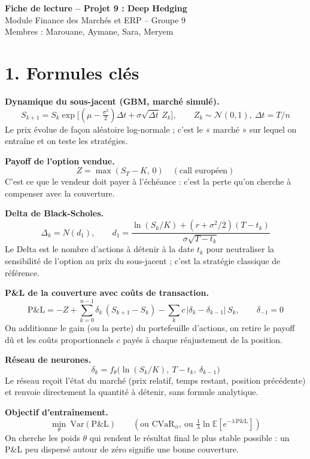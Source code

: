 \documentclass[10.5pt,a4paper]{article}
\begin{document}
\begin{center}
{\Large\bfseries Fiche de lecture -- Projet 9 : Deep Hedging}\\[2pt]
Module Finance des Marchés et ERP -- Groupe 9\\
Membres : Marouane, Aymane, Sara, Meryem
\end{center}

\section*{1. Formules clés}

\textbf{Dynamique du sous-jacent (GBM, marché simulé).}
\[
S_{k+1} = S_k \exp\!\Big[(\mu-\tfrac{\sigma^2}{2})\Delta t + \sigma\sqrt{\Delta t}\,Z_k\Big],\qquad Z_k\sim\mathcal N(0,1),\ \Delta t=T/n
\]
Le prix évolue de façon aléatoire log-normale ; c'est le « marché » sur lequel on entraîne et on teste les stratégies.

\textbf{Payoff de l'option vendue.}
\[
Z = \max(S_T-K,\,0)\quad(\text{call européen})
\]
C'est ce que le vendeur doit payer à l'échéance : c'est la perte qu'on cherche à compenser avec la couverture.

\textbf{Delta de Black-Scholes.}
\[
\Delta_k = N(d_1),\qquad d_1=\frac{\ln(S_k/K)+(r+\sigma^2/2)(T-t_k)}{\sigma\sqrt{T-t_k}}
\]
Le Delta est le nombre d'actions à détenir à la date $t_k$ pour neutraliser la sensibilité de l'option au prix du sous-jacent ; c'est la stratégie classique de référence.

\textbf{P\&L de la couverture avec coûts de transaction.}
\[
\text{P\&L} = -Z + \sum_{k=0}^{n-1}\delta_k\,(S_{k+1}-S_k) - \sum_{k}c\,|\delta_k-\delta_{k-1}|\,S_k,\qquad \delta_{-1}=0
\]
On additionne le gain (ou la perte) du portefeuille d'actions, on retire le payoff dû et les coûts proportionnels $c$ payés à chaque réajustement de la position.

\textbf{Réseau de neurones.}
\[
\delta_k = f_\theta\big(\ln(S_k/K),\ T-t_k,\ \delta_{k-1}\big)
\]
Le réseau reçoit l'état du marché (prix relatif, temps restant, position précédente) et renvoie directement la quantité à détenir, sans formule analytique.

\textbf{Objectif d'entraînement.}
\[
\min_\theta\ \mathrm{Var}(\text{P\&L})\qquad(\text{ou } \mathrm{CVaR}_\alpha,\ \text{ou } \tfrac1\lambda\ln \mathbb E[e^{-\lambda\,\text{P\&L}}])
\]
On cherche les poids $\theta$ qui rendent le résultat final le plus stable possible : un P\&L peu dispersé autour de zéro signifie une bonne couverture.
\end{document}
